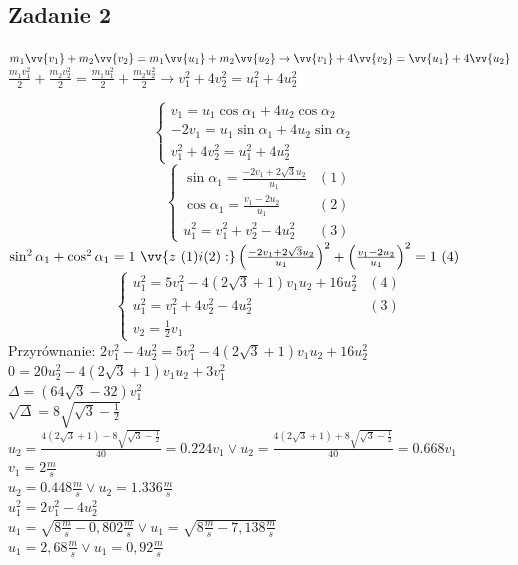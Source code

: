 \documentclass[14pt]{extarticle}
\begin{document}
    \subsection{Zadanie 2}
    \large
    $m_1\vv{v_1}+m_2\vv{v_2}=m_1\vv{u_1}+m_2\vv{u_2} \rightarrow \vv{v_1} + 4\vv{v_2} = \vv{u_1} + 4\vv{u_2}$\\
    $\frac{m_1v_1^2}{2}+\frac{m_2v_2^2}{2}=\frac{m_1u_1^2}{2}+\frac{m_2u_2^2}{2} \rightarrow v_1^2 + 4v_2^2 = u_1^2 + 4u_2^2 $
    
    \begin{equation*}
        \begin{cases}
            v_1 = u_1\cos\alpha _1 + 4u_2\cos\alpha _2 &\\
            -2v_1  = u_1\sin\alpha _1 + 4u_2\sin\alpha _2 &\\
            v_1^2 + 4v_2^2 = u_1^2 + 4u_2^2  &
        \end{cases}
    \end{equation*}
    \begin{equation*}
        \begin{cases}
            \sin\alpha _1 = \frac{-2v_1+2{\sqrt{3}}u_2}{u_1}&(1)\\
            \cos\alpha _1 = \frac{v_1-2u_2}{u_1}&(2)\\
            u_1^2 = v_1^2 + v_2^2 - 4u_2^2&(3)
        \end{cases}
    \end{equation*}
    $\sin^2\alpha _1 + \cos^2\alpha _1 = 1\ \vv{z \ (1)i(2):}
    \left(\frac{-2v_1+2{\sqrt{3}}u_2}{u_1}\right)^2 + \left(\frac{v_1-2u_2}{u_1}\right)^2 = 1 \ (4)$
    \begin{equation*}
        \begin{cases}
            u_1^2 = 5v_1^2-4\left(2{\sqrt{3}}+1\right)v_1u_2+16u_2^2&(4)\\
            u_1^2 = v_1^2 + 4v_2^2 - 4u_2^2&(3)\\
            v_2 = \frac{1}{2}v_1&
        \end{cases}
    \end{equation*}
        Przyrównanie: $2v_1^2 - 4u_2^2=5v_1^2-4\left(2{\sqrt{3}}+1\right)v_1u_2+16u_2^2$\\
        $ 0 = 20u_2^2-4\left(2{\sqrt{3}}+1\right)v_1u_2+3v_1^2 $\\

        $\Delta = \left(64\sqrt{{3}}-32\right)v_1^2 $\\
        $\sqrt{{\Delta}} = 8\sqrt{{\sqrt{3}-\frac{1}{2}}} $\\
        $u_2 = \frac{4\left(2\sqrt{3}+1\right)-8\sqrt{{\sqrt{3}-\frac{1}{2}}}}{40}=0.224v_1 \lor
        u_2 = \frac{4\left(2\sqrt{3}+1\right)+8\sqrt{{\sqrt{3}-\frac{1}{2}}}}{40}=0.668v_1$ \\
        $v_1=2 \frac{m}{s}$\\
        $u_2 = 0.448\frac{m}{s} \lor u_2 = 1.336\frac{m}{s}$\\
        $u_1^2=2v_1^2-4u_2^2$\\
        $u_1=\sqrt{8\frac{m}{s}-0,802\frac{m}{s}} \lor u_1=\sqrt{8\frac{m}{s}-7,138\frac{m}{s}} $\\
        $u_1=2,68\frac{m}{s} \lor  u_1=0,92\frac{m}{s} $\\
\end{document}
